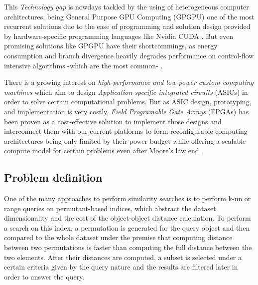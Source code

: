 \documentclass[11pt,letterpaper]{article}
\begin{document}
    This \emph{Technology gap} is nowdays tackled by the using of heterogeneous computer architectures, being
    General Purpose GPU Computing (GPGPU) one of the most recurrent solutions due to the ease of programming
    and solution design provided by hardware-specific programming languages like Nvidia CUDA
    \cite{NVIDIA_volta}. But even promising solutions like GPGPU have their shortcommings, as energy consumption and branch divergence heavily degrades performance on control-flow intensive algorithms
    -which are the most common- \cite{6376229}.


    There is a growing interest on \emph{high-performance and low-power custom computing machines} which 
    aim to design \emph{Application-specific integrated circuits} (ASICs) in order to solve certain 
    computational problems. But as ASIC design, prototyping, and implementation is very costly,
    \emph{Field Programable Gate Arrays} (FPGAs) has been proven as a cost-effective solution to implement those 
    designs and interconnect them with our current platforms to form reconfigurable computing architectures
    \cite{ReconfigurableComputing, 6589302} being only limited by their power-budget while offering 
    a scalable compute model for certain problems even after Moore's law end.

\subsection{Problem definition} 
    One of the many approaches to perform similarity searches is to perform k-nn or range queries on permutant-based 
    indices, which abstract the dataset dimensionality and the cost of the object-object distance calculation. To 
    perform a search on this index, a permutation is generated for the query object and then compared to the whole 
    dataset under the premise that computing distance between two permutations is faster than computing the full 
    distance between the two elements. After their distances are computed, a subset is selected under a certain 
    criteria given by the query nature and the results are filtered later in order to answer the query.\cite{5271946,5271944}
\end{document}
